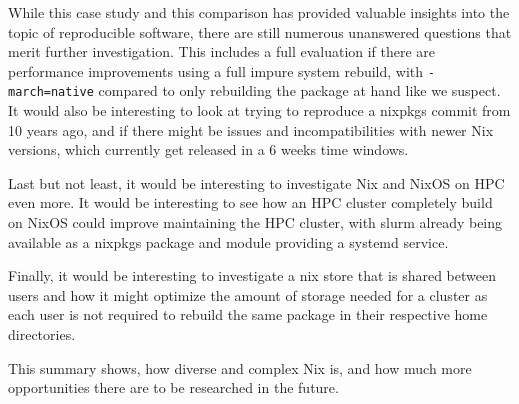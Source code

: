 \documentclass[conference,final,a4paper]{IEEEtran}
\begin{document}
While this case study and this comparison has provided valuable insights into the topic of reproducible software, there are still numerous unanswered questions that merit further investigation.
This includes a full evaluation if there are performance improvements using a full impure system rebuild, with \texttt{-march=native} compared to only rebuilding the package at hand like we suspect.
It would also be interesting to look at trying to reproduce a nixpkgs commit from 10 years ago, and if there might be issues and incompatibilities with newer Nix versions, which currently get released in a 6 weeks time windows.

Last but not least, it would be interesting to investigate Nix and NixOS on HPC even more.
It would be interesting to see how an HPC cluster completely build on NixOS could improve maintaining the HPC cluster, with slurm already being available as a nixpkgs package and module providing a systemd service.

Finally, it would be interesting to investigate a nix store that is shared between users and how it might optimize the amount of storage needed for a cluster as each user is not required to rebuild the same package in their respective home directories.

This summary shows, how diverse and complex Nix is, and how much more opportunities there are to be researched in the future.



\end{document}
